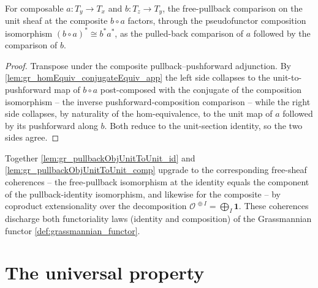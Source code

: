 \begin{lemma}
  \label{lem:gr_pullbackObjUnitToUnit_comp}
  For composable \(a : T_y \to T_x\) and \(b : T_z \to T_y\), the free-pullback comparison on
  the unit sheaf at the composite \(b \circ a\) factors, through the pseudofunctor composition
  isomorphism \((b\circ a)^{*}\cong b^{*}a^{*}\), as the pulled-back comparison of \(a\)
  followed by the comparison of \(b\).
\end{lemma}
\begin{proof}
  \leanok
  Transpose under the composite pullback--pushforward adjunction. By
  \cref{lem:gr_homEquiv_conjugateEquiv_app} the left side collapses to the unit-to-pushforward
  map of \(b\circ a\) post-composed with the conjugate of the composition isomorphism -- the
  inverse pushforward-composition comparison -- while the right side collapses, by naturality
  of the hom-equivalence, to the unit map of \(a\) followed by its pushforward along \(b\).
  Both reduce to the unit-section identity, so the two sides agree.
\end{proof}


Together \cref{lem:gr_pullbackObjUnitToUnit_id} and \cref{lem:gr_pullbackObjUnitToUnit_comp}
upgrade to the corresponding free-sheaf coherences -- the free-pullback isomorphism at the
identity equals the component of the pullback-identity isomorphism, and likewise for the
composite -- by coproduct extensionality over the decomposition
\(\mathcal{O}^{\,\oplus I} = \bigoplus_I \mathbf 1\). These coherences discharge both
functoriality laws (identity and composition) of the Grassmannian
functor \cref{def:grassmannian_functor}.


\section{The universal property}
\label{sec:grquot_universal}

